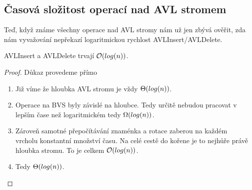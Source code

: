 \subsection{Časová složitost operací nad AVL stromem}

Teď, když známe všechny operace nad AVL stromy nám už jen zbývá ověřit, zda nám vyvažování nepřekazí logaritmickou rychlost AVLInsert/AVLDelete.

\begin{theorem}
    AVLInsert a AVLDelete trvají $\mathcal{O}(log(n))$.
\end{theorem}

\begin{proof}
    Důkaz provedeme přímo
    \begin{enumerate}
        \item Již víme že hloubka AVL stromu je vždy $\Theta(log(n))$.
        \item Operace na BVS byly závislé na hloubce. Tedy určitě nebudou pracovat v lepším čase než logaritmickém tedy $\Omega(log(n))$.
        \item Zároveň samotné přepočítávání znaménka a rotace zaberou na každém vrcholu konstantní množství času. Na celé cestě do kořene je to nejhůře právě hloubka stromu. To je celkem $\mathcal{O}(log(n))$.
        \item Tedy $\Theta(log(n))$.
    \end{enumerate}
\end{proof}
